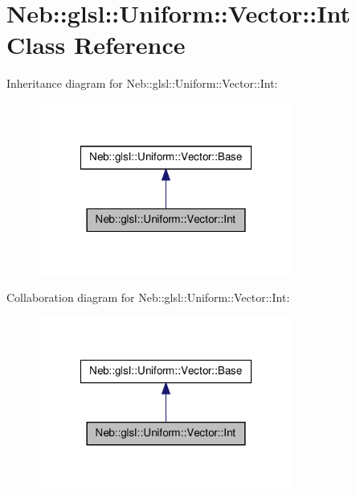 \hypertarget{classNeb_1_1glsl_1_1Uniform_1_1Vector_1_1Int}{\section{\-Neb\-:\-:glsl\-:\-:\-Uniform\-:\-:\-Vector\-:\-:\-Int \-Class \-Reference}
\label{classNeb_1_1glsl_1_1Uniform_1_1Vector_1_1Int}
}


\-Inheritance diagram for \-Neb\-:\-:glsl\-:\-:\-Uniform\-:\-:\-Vector\-:\-:\-Int\-:\nopagebreak
\begin{figure}[H]
\begin{center}
\leavevmode
\includegraphics[width=238pt]{classNeb_1_1glsl_1_1Uniform_1_1Vector_1_1Int__inherit__graph}
\end{center}
\end{figure}


\-Collaboration diagram for \-Neb\-:\-:glsl\-:\-:\-Uniform\-:\-:\-Vector\-:\-:\-Int\-:\nopagebreak
\begin{figure}[H]
\begin{center}
\leavevmode
\includegraphics[width=238pt]{classNeb_1_1glsl_1_1Uniform_1_1Vector_1_1Int__coll__graph}
\end{center}
\end{figure}
